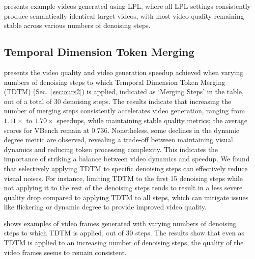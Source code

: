  presents example videos generated using LPL, where all LPL settings consistently produce semantically identical target videos, with most video quality remaining stable across various numbers of denoising steps.



\subsection{Temporal Dimension Token Merging}


 presents the video quality and video generation speedup achieved when varying numbers of denoising steps to which Temporal Dimension Token Merging (TDTM) (Sec.~\ref{sec:ours2}) is applied, indicated as `Merging Steps' in the table, out of a total of 30 denoising steps. 
The results indicate that increasing the number of merging steps consistently accelerates video generation, ranging from $1.11\times$ to $1.70\times$ speedups, while maintaining stable quality metrics; the average scores for VBench remain at 0.736.
Nonetheless, some declines in the dynamic degree metric are observed, revealing a trade-off between maintaining visual dynamics and reducing token processing complexity. This indicates the importance of striking a balance between video dynamics and speedup. We found that selectively applying TDTM to specific denoising steps can effectively reduce visual noises. For instance, limiting TDTM to the first 15 denoising steps while not applying it to the rest of the denoising steps tends to result in a less severe quality drop compared to applying TDTM to all steps, which can mitigate issues like flickering or dynamic degree to provide improved video quality.

 shows examples of video frames generated with varying numbers of denoising steps to which TDTM is applied, out of 30 steps. The results show that even as TDTM is applied to an increasing number of denoising steps, the quality of the video frames seems to remain consistent.




